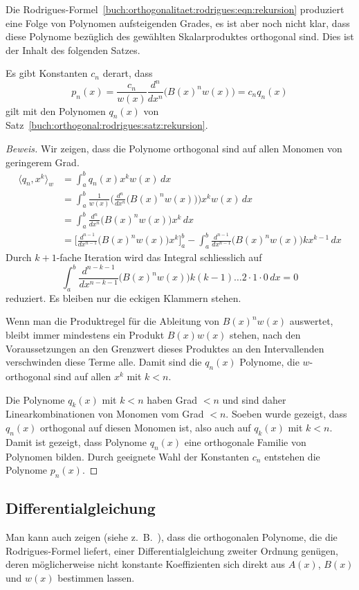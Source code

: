 Die Rodrigues-Formel~\eqref{buch:orthogonalitaet:rodrigues:eqn:rekursion}
produziert eine Folge von Polynomen aufsteigenden Grades, es ist aber
noch nicht klar, dass diese Polynome bezüglich des gewählten Skalarproduktes
orthogonal sind.
Dies ist der Inhalt des folgenden Satzes.

\begin{satz}
%
Es gibt Konstanten $c_n$ derart, dass
\[
p_n(x)
=
\frac{c_n}{w(x)} \frac{d^n}{dx^n} \bigl(B(x)^n w(x)\bigr) 
=
c_n q_n(x)
\]
gilt mit den Polynomen $q_n(x)$ von
Satz~\ref{buch:orthogonal:rodrigues:satz:rekursion}.
\end{satz}

\begin{proof}[Beweis]
Wir zeigen, dass die Polynome orthogonal sind auf allen Monomen
von geringerem Grad.
\begin{align*}
\langle q_n, x^k\rangle_w
&=
\int_a^b q_n(x)x^kw(x)\,dx
\\
&=
\int_a^b \frac{1}{w(x)}
\biggl(\frac{d^n}{dx^n}\bigl(B(x)^n w(x)\bigr)\biggr)
x^k w(x)\,dx
\\
&=
\int_a^b \frac{d^n}{dx^n}\bigl(B(x)^n w(x)\bigr) x^k \,dx
\\
&=
\biggl[\frac{d^{n-1}}{dx^{n-1}}\bigl(B(x)^n w(x)\bigr) x^k \biggr]_a^b
-
\int_a^b \frac{d^{n-1}}{dx^{n-1}}\bigl(B(x)^n w(x)\bigr)kx^{k-1}\,dx
\end{align*}
Durch $k+1$-fache Iteration wird das Integral schliesslich auf
\[
\int_a^b
\frac{d^{n-k-1}}{dx^{n-k-1}}
\bigl(B(x)^nw(x)\bigr)
k(k-1)\dots2\cdot1\cdot 0\,dx
=
0
\]
reduziert.
Es bleiben nur die eckigen Klammern stehen.

Wenn man die Produktregel für die Ableitung
von $B(x)^nw(x)$ auswertet, bleibt immer mindestens ein Produkt
$B(x)w(x)$ stehen,
nach den Voraussetzungen an den Grenzwert dieses Produktes an den
Intervallenden verschwinden diese Terme alle.
Damit sind die $q_n(x)$ Polynome, die $w$-orthogonal sind auf allen
$x^k$ mit $k<n$.

Die Polynome $q_k(x)$ mit $k< n$ haben Grad $<n$ und sind daher
Linearkombinationen von Monomen vom Grad $<n$.
Soeben wurde gezeigt, dass $q_n(x)$ orthogonal auf diesen Monomen
ist, also auch auf $q_k(x)$ mit $k<n$.
Damit ist gezeigt, dass Polynome $q_n(x)$ eine orthogonale Familie
von Polynomen bilden.
Durch geeignete Wahl der Konstanten $c_n$ entstehen die Polynome $p_n(x)$.
\end{proof}

\subsection{Differentialgleichung}
Man kann auch zeigen (siehe z.~B.~\cite{buch:pearsondgl}),
dass die orthogonalen Polynome, die die
Rodrigues-Formel liefert, einer Differentialgleichung zweiter 
Ordnung genügen, deren möglicherweise nicht konstante Koeffizienten
sich direkt aus $A(x)$, $B(x)$ und $w(x)$ bestimmen lassen.

